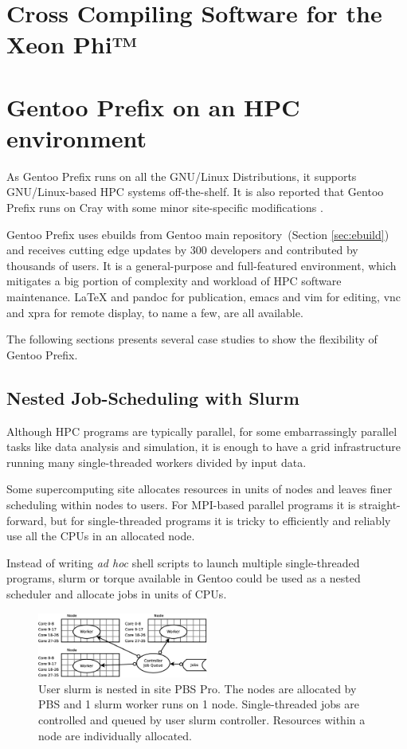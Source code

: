 \documentclass[a4paper,conference]{IEEEtran}
\begin{document}

\section{Cross Compiling Software for the Xeon Phi™}

\section{Gentoo Prefix on an HPC environment}
As Gentoo Prefix runs on all the GNU/Linux Distributions, it supports
GNU/Linux-based HPC systems off-the-shelf.  It is also reported that
Gentoo Prefix runs on Cray with some minor site-specific modifications
\cite{cray}.

Gentoo Prefix uses ebuilds from Gentoo main repository~(Section
\ref{sec:ebuild}) and receives cutting edge updates by 300 developers
and contributed by thousands of users.  It is a general-purpose and
full-featured environment, which mitigates a big portion of complexity
and workload of HPC software maintenance. \LaTeX{} and pandoc for
publication, emacs and vim for editing, vnc and xpra for remote
display, to name a few, are all available.

The following sections presents several case studies to show the
flexibility of Gentoo Prefix.

\subsection{Nested Job-Scheduling with Slurm}
\label{sec:slurm}
Although HPC programs are typically parallel, for some embarrassingly
parallel tasks like data analysis and simulation, it is enough to have
a grid infrastructure running many single-threaded workers divided by
input data.

Some supercomputing site allocates resources in units of nodes and
leaves finer scheduling within nodes to users.  For MPI-based parallel
programs it is straight-forward, but for single-threaded programs it
is tricky to efficiently and reliably use all the CPUs in an allocated
node.

Instead of writing \textit{ad hoc} shell scripts to launch multiple
single-threaded programs, slurm or torque available in Gentoo could be
used as a nested scheduler and allocate jobs in units of
CPUs.

\begin{figure}[htb]
  \centering
  \includegraphics[width=0.5\textwidth]{node-slurm.eps}
  \caption{User slurm is nested in site PBS Pro.  The nodes are
    allocated by PBS and 1 slurm worker runs on 1 node.
    Single-threaded jobs are controlled and queued by user slurm
    controller.  Resources within a node are individually allocated.}
  \label{fig:slurm}
\end{figure}
\end{document}

